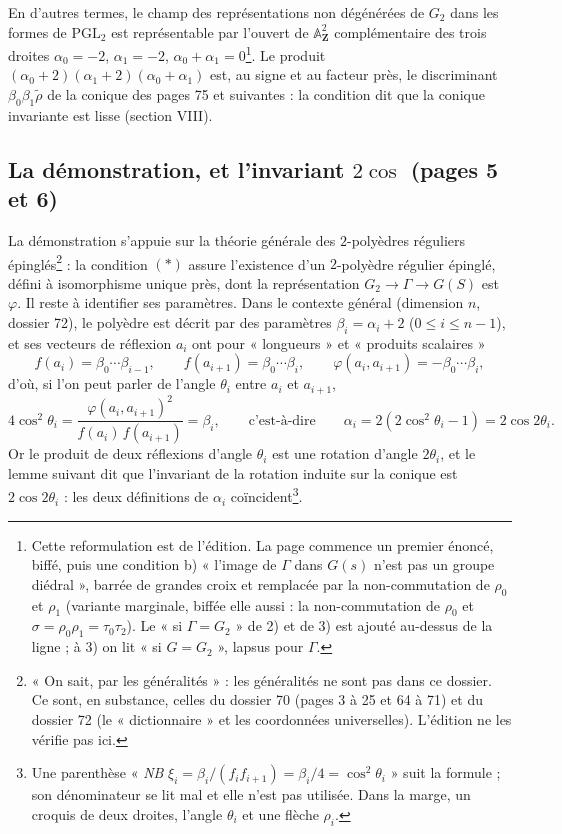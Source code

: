 \documentclass[11pt,a4paper]{article}
\begin{document}
En d'autres termes, le champ des représentations non dégénérées de $G_2$ dans
les formes de $\mathrm{PGL}_2$ est représentable par l'ouvert de
$\mathbb{A}^2_{\mathbf{Z}}$ complémentaire des trois droites $\alpha_0 = -2$,
$\alpha_1 = -2$, $\alpha_0 + \alpha_1 = 0$\footnote{Cette reformulation est de
l'édition. La page commence un premier énoncé, biffé, puis une condition b)
« l'image de $\Gamma$ dans $G(s)$ n'est pas un groupe diédral », barrée de
grandes croix et remplacée par la non-commutation de $\rho_0$ et $\rho_1$
(variante marginale, biffée elle aussi : la non-commutation de $\rho_0$ et
$\sigma = \rho_0\rho_1 = \tau_0\tau_2$). Le « si $\Gamma = G_2$ » de 2) et
de 3) est ajouté au-dessus de la ligne ; à 3) on lit « si $G = G_2$ »,
lapsus pour $\Gamma$.}. Le produit $(\alpha_0 + 2)(\alpha_1 + 2)(\alpha_0 +
\alpha_1)$ est, au signe et au facteur près, le discriminant
$\beta_0\beta_1\tilde\rho$ de la conique des pages 75 et suivantes : la
condition dit que la conique invariante est lisse (section VIII).

\subsection*{La démonstration, et l'invariant $2\cos$ (pages 5 et 6)}

La démonstration s'appuie sur la théorie générale des $2$-polyèdres réguliers
épinglés\footnote{« On sait, par les généralités » : les généralités ne sont
pas dans ce dossier. Ce sont, en substance, celles du dossier 70 (pages 3 à
25 et 64 à 71) et du dossier 72 (le « dictionnaire » et les coordonnées
universelles). L'édition ne les vérifie pas ici.} : la condition $(*)$ assure
l'existence d'un $2$-polyèdre régulier épinglé, défini à isomorphisme unique
près, dont la représentation $G_2 \to \Gamma \to G(S)$ est $\varphi$. Il reste
à identifier ses paramètres. Dans le contexte général (dimension $n$, dossier
72), le polyèdre est décrit par des paramètres $\beta_i = \alpha_i + 2$
($0 \leq i \leq n - 1$), et ses vecteurs de réflexion $a_i$ ont pour
« longueurs » et « produits scalaires »
\[
  f(a_i) = \beta_0 \cdots \beta_{i-1}, \qquad f(a_{i+1}) = \beta_0 \cdots
  \beta_i, \qquad \varphi(a_i, a_{i+1}) = -\beta_0 \cdots \beta_i ,
\]
d'où, si l'on peut parler de l'angle $\theta_i$ entre $a_i$ et $a_{i+1}$,
\[
  4\cos^2\theta_i = \frac{\varphi(a_i, a_{i+1})^2}{f(a_i)\, f(a_{i+1})} =
  \beta_i, \qquad \text{c'est-à-dire} \qquad \alpha_i = 2(2\cos^2\theta_i - 1)
  = 2\cos 2\theta_i .
\]
Or le produit de deux réflexions d'angle $\theta_i$ est une rotation d'angle
$2\theta_i$, et le lemme suivant dit que l'invariant de la rotation induite sur
la conique est $2\cos 2\theta_i$ : les deux définitions de $\alpha_i$
coïncident\footnote{Une parenthèse « \emph{NB} $\xi_i = \beta_i/(f_i f_{i+1}) =
\beta_i/4 = \cos^2\theta_i$ » suit la formule ; son dénominateur se lit mal et
elle n'est pas utilisée. Dans la marge, un croquis de deux droites, l'angle
$\theta_i$ et une flèche $\rho_i$.}.
\end{document}
